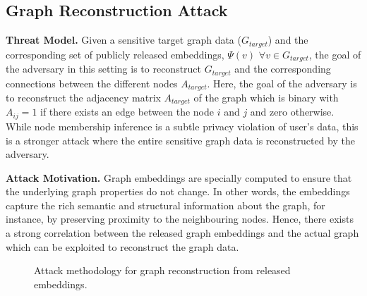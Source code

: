 \subsection{Graph Reconstruction Attack}

\noindent\textbf{Threat Model.} Given a sensitive target graph data ($G_{target}$) and the corresponding set of publicly released embeddings, $\Psi (v)$ $\forall v \in G_{target}$, the goal of the adversary in this setting is to reconstruct $G_{target}$ and the corresponding connections between the different nodes $A_{target}$.
Here, the goal of the adversary is to reconstruct the adjacency matrix $A_{target}$ of the graph which is binary with $A_{ij}=1$ if there exists an edge between the node $i$ and $j$ and zero otherwise.
While node membership inference is a subtle privacy violation of user's data, this is a stronger attack where the entire sensitive graph data is reconstructed by the adversary.

\noindent\textbf{Attack Motivation.} Graph embeddings are specially computed to ensure that the underlying graph properties do not change.
In other words, the embeddings capture the rich semantic and structural information about the graph, for instance, by preserving proximity to the neighbouring nodes.
Hence, there exists a strong correlation between the released graph embeddings and the actual graph which can be exploited to reconstruct the graph data.

\begin{figure}[!htb]
    \centering
    \begin{minipage}[b]{1\linewidth}
    \centering


    \end{minipage}
    \caption{Attack methodology for graph reconstruction from released embeddings.}
    \label{fig:recattack}
\end{figure}


